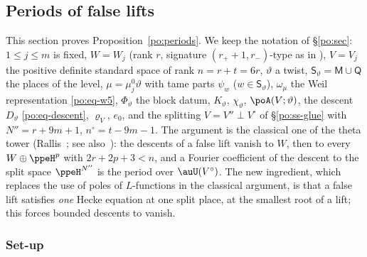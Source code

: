 \documentclass[10pt]{amsart}
\theoremstyle{definition}
\theoremstyle{remark}
\begin{document}
\subsection{Periods of false lifts}\label{ppe:sec}

This section proves Proposition~\ref{po:periods}. We keep the notation of \S\ref{po:sec}:
$1\le j\le m$ is fixed, $W=W_j$ (rank $r$, signature $(r_++1,r_-)$-type as in
{\cite[\S14.3]{P46}}), $V=V_j$ the positive definite standard space of rank $n=r+t=6r$,
$\vartheta$ a twist, $\mathsf S_\vartheta=\mathsf M\cup\mathsf Q$ the places of the level, $\mu=\mu_j^0
\vartheta$ with tame parts $\psi_w$ ($w\in\mathsf S_\vartheta$), $\omega_\mu$ the Weil
representation \eqref{po:eq-w5}, $\Phi_\vartheta$ the block datum, $K_\vartheta$, $\chi_\vartheta$,
$\poA(V;\vartheta)$, the descent $D_\vartheta$ \eqref{po:eq-descent}, $\varrho_V$, $e_0$, and the
splitting $V=V''\perp V^\circ$ of \S\ref{po:ss-glue} with $N''=r+9m+1$, $n^\circ=t-9m-1$. The
argument is the classical one of the theta tower (Rallis~\cite[Chapter~I, \S1]{RallisHoweDuality}; see also~\cite{RallisInjectivity}): the descents of a
false lift vanish to $W$, then to every $W\oplus\ppeH^p$ with $2r+2p+3<n$, and a Fourier
coefficient of the descent to the split space $\ppeH^{N''}$ is the period over $\auU(V^\circ)$.
The new ingredient, which replaces the use of poles of $L$-functions in the classical argument,
is that a false lift satisfies \emph{one} Hecke equation at one split place, at the smallest root
of a lift; this forces bounded descents to vanish.

\subsubsection{Set-up}\label{ppe:ss-setup}
\end{document}
